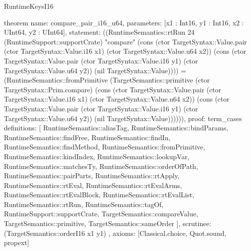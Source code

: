 \begin{lexlean}{RuntimeKeysI16}
\begin{semanticmodule}
theorem{
  name: compare_pair_i16_u64,
  parameters: [x1 : Int16, y1 : Int16, x2 : UInt64, y2 : UInt64],
  statement: ((RuntimeSemantics::rtRun 24 (RuntimeSupport::supportCrate) "compare" (cons (ctor TargetSyntax::Value.pair (ctor TargetSyntax::Value.i16 x1) (ctor TargetSyntax::Value.u64 x2)) (cons (ctor TargetSyntax::Value.pair (ctor TargetSyntax::Value.i16 y1) (ctor TargetSyntax::Value.u64 y2)) (nil TargetSyntax::Value)))) = (RuntimeSemantics::fromPrimitive (TargetSemantics::primitive (ctor TargetSyntax::Prim.compare) (cons (ctor TargetSyntax::Value.pair (ctor TargetSyntax::Value.i16 x1) (ctor TargetSyntax::Value.u64 x2)) (cons (ctor TargetSyntax::Value.pair (ctor TargetSyntax::Value.i16 y1) (ctor TargetSyntax::Value.u64 y2)) (nil TargetSyntax::Value)))))),
  proof: term_cases{
    definitions: [
      RuntimeSemantics::aliasTag,
      RuntimeSemantics::bindParams,
      RuntimeSemantics::findFree,
      RuntimeSemantics::findIn,
      RuntimeSemantics::findMethod,
      RuntimeSemantics::fromPrimitive,
      RuntimeSemantics::kindIndex,
      RuntimeSemantics::lookupVar,
      RuntimeSemantics::matchesTy,
      RuntimeSemantics::orderOfPath,
      RuntimeSemantics::pairParts,
      RuntimeSemantics::rtApply,
      RuntimeSemantics::rtEval,
      RuntimeSemantics::rtEvalArms,
      RuntimeSemantics::rtEvalBlock,
      RuntimeSemantics::rtEvalList,
      RuntimeSemantics::rtRun,
      RuntimeSemantics::tagOf,
      RuntimeSupport::supportCrate,
      TargetSemantics::compareValue,
      TargetSemantics::primitive,
      TargetSemantics::sameOrder
    ],
    scrutinee: (TargetSemantics::orderI16 x1 y1)
  },
  axioms: [Classical.choice, Quot.sound, propext]
}


\end{semanticmodule}
\end{lexlean}
